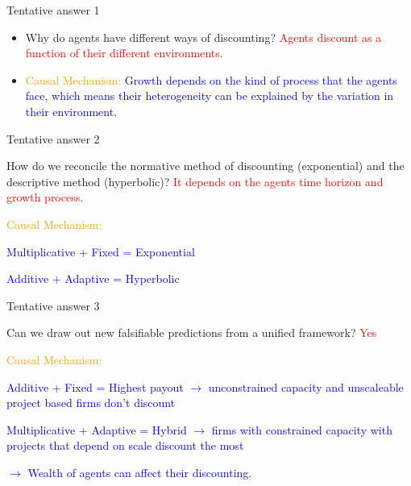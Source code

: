 \documentclass{beamer}
\numberwithin{equation}{section}
\begin{document}
\begin{frame}{Tentative answer 1}
\begin{itemize}
    \item Why do agents have different ways of discounting?\textcolor{red}{ Agents discount as a function of their different environments.}
    \item \textcolor{orange}{Causal Mechanism:} \textcolor{blue}{Growth depends on the kind of process that the agents face, which means their heterogeneity can be explained by the variation in their environment.}
\end{itemize}
\end{frame}
\begin{frame}{Tentative answer 2}
\begin{itemize}
    \item How do we reconcile the normative method of discounting (exponential) and the descriptive method (hyperbolic)? \textcolor{red}{It depends on the agents time horizon and growth process.}
    \item \textcolor{orange}{Causal Mechanism:} \textcolor{blue}{
    \item Multiplicative + Fixed = Exponential
    \item Additive + Adaptive = Hyperbolic}
\end{itemize}
\end{frame}
\begin{frame}{Tentative answer 3}
\begin{itemize}
    \item Can we draw out new falsifiable predictions from a unified framework? \textcolor{red}{Yes}
    \item \textcolor{orange}{Causal Mechanism:} \textcolor{blue}{
    \item Additive + Fixed = Highest payout $\rightarrow$ unconstrained capacity and unscaleable project based firms don't discount
    \item Multiplicative + Adaptive = Hybrid $\rightarrow$ firms with constrained capacity with projects that depend on scale discount the most
    \item $\rightarrow$ Wealth of agents can affect their discounting. } 
\end{itemize}
\end{frame}
\end{document}

